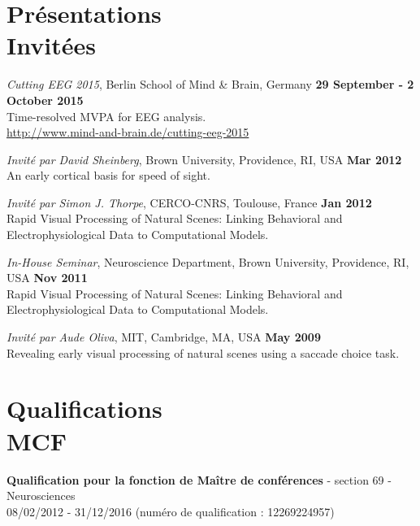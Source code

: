 \documentclass[margin,line]{resume}
\begin{document}
\begin{resume}
	\normalsize

\vspace{3mm}
\section{\mysidestyle Présentations\\Invitées}
    
	\footnotesize

	\textit{Cutting EEG 2015}, Berlin School of Mind \& Brain, Germany \hfill \textbf{29 September - 2 October 2015}\\
	Time-resolved MVPA for EEG analysis. \\
	\url{http://www.mind-and-brain.de/cutting-eeg-2015}
	
	\vspace{-2mm} 
	\textit{Invité par David Sheinberg}, Brown University, Providence, RI, USA \hfill \textbf{Mar 2012}\\
	An early cortical basis for speed of sight. 

	\vspace{-2mm} 
	\textit{Invité par Simon J. Thorpe}, CERCO-CNRS, Toulouse, France \hfill \textbf{Jan 2012}\\
	Rapid Visual Processing of Natural Scenes: Linking Behavioral and Electrophysiological Data to Computational Models.

	\vspace{-2mm} 
	\textit{In-House Seminar}, Neuroscience Department, Brown University, Providence, RI, USA \hfill \textbf{Nov 2011}\\
	Rapid Visual Processing of Natural Scenes: Linking Behavioral and Electrophysiological Data to Computational Models.

	\vspace{-2mm} 
	\textit{Invité par Aude Oliva}, MIT, Cambridge, MA, USA \hfill \textbf{May 2009}\\
	Revealing early visual processing of natural scenes using a saccade choice task.

	\normalsize

\vspace{3mm}
\section{\mysidestyle Qualifications\\MCF}
    \textbf{Qualification pour la fonction de Maître de conférences} - section 69 - Neurosciences\\
    08/02/2012 - 31/12/2016 (numéro de qualification : 12269224957)


\end{resume}
\end{document}
